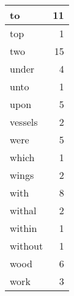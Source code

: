 \begin{center}
\begin{longtable}{l|r}
to & 11 \\ \hline
top & 1 \\ \hline
two & 15 \\ \hline
under & 4 \\ \hline
unto & 1 \\ \hline
upon & 5 \\ \hline
vessels & 2 \\ \hline
were & 5 \\ \hline
which & 1 \\ \hline
wings & 2 \\ \hline
with & 8 \\ \hline
withal & 2 \\ \hline
within & 1 \\ \hline
without & 1 \\ \hline
wood & 6 \\ \hline
work & 3 \\ \hline
\end{longtable}
\end{center}



\normalsize



